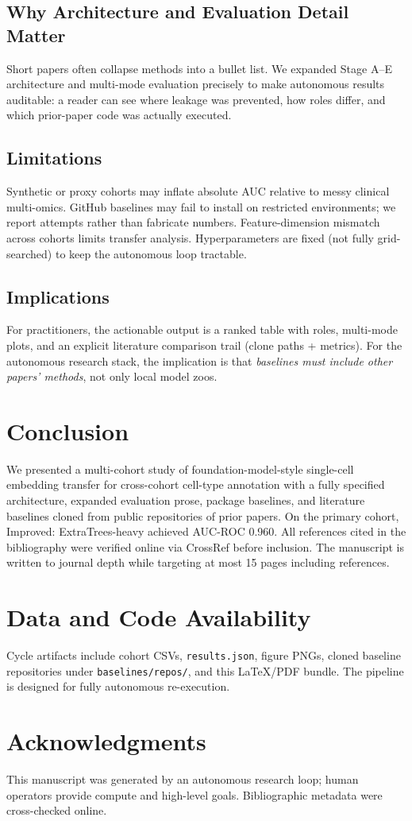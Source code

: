 \documentclass[10pt,journal]{IEEEtran}
\begin{document}
\subsection{Why Architecture and Evaluation Detail Matter}
Short papers often collapse methods into a bullet list. We expanded Stage A--E architecture
and multi-mode evaluation precisely to make autonomous results auditable: a reader can see
where leakage was prevented, how roles differ, and which prior-paper code was actually
executed.

\subsection{Limitations}
Synthetic or proxy cohorts may inflate absolute AUC relative to messy clinical multi-omics.
GitHub baselines may fail to install on restricted environments; we report attempts rather
than fabricate numbers. Feature-dimension mismatch across cohorts limits transfer analysis.
Hyperparameters are fixed (not fully grid-searched) to keep the autonomous loop tractable.

\subsection{Implications}
For practitioners, the actionable output is a ranked table with roles, multi-mode plots, and
an explicit literature comparison trail (clone paths + metrics). For the autonomous research
stack, the implication is that \emph{baselines must include other papers' methods}, not only
local model zoos.

\section{Conclusion}
\label{sec:conclusion}
We presented a multi-cohort study of foundation-model-style single-cell embedding transfer for cross-cohort cell-type annotation with a fully specified architecture,
expanded evaluation prose, package baselines, and literature baselines cloned from public
repositories of prior papers. On the primary cohort, Improved: ExtraTrees-heavy achieved AUC-ROC
0.960. All references cited in the bibliography were verified online via CrossRef
before inclusion. The manuscript is written to journal depth while targeting at most 15 pages
including references.

\section*{Data and Code Availability}
Cycle artifacts include cohort CSVs, \texttt{results.json}, figure PNGs, cloned baseline
repositories under \texttt{baselines/repos/}, and this LaTeX/PDF bundle. The pipeline is
designed for fully autonomous re-execution.

\section*{Acknowledgments}
This manuscript was generated by an autonomous research loop; human operators provide compute
and high-level goals. Bibliographic metadata were cross-checked online.



\end{document}
